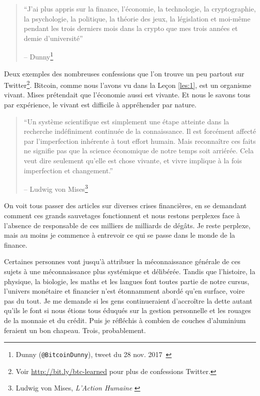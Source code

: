 \begin{quotation}\begin{samepage}
\enquote{J'ai plus appris sur la finance, l'économie, la technologie, la
cryptographie, la psychologie, la politique, la théorie des jeux, la législation
et moi-même pendant les trois derniers mois dans la crypto que mes trois années
et demie d'université}
\begin{flushright} -- Dunny\footnote{Dunny (\texttt{@BitcoinDunny}), tweet du 28
nov. 2017~\cite{bitcoindunny-tweet}}
\end{flushright}\end{samepage}\end{quotation}

Deux exemples des nombreuses confessions que l'on trouve un peu partout sur
Twitter\footnote{Voir \url{http://bit.ly/btc-learned} pour plus de confessions
Twitter.}. Bitcoin, comme nous l'avons vu dans la Leçon \ref{les:1}, est un
organisme vivant. Mises prétendait que l'économie aussi est vivante. Et nous le
savons tous par expérience, le vivant est difficile à appréhender par nature.

\begin{quotation}\begin{samepage}
\enquote{Un système scientifique est simplement une étape atteinte dans la
recherche indéfiniment continuée de la connaissance. Il est forcément affecté
par l'imperfection inhérente à tout effort humain. Mais reconnaître ces faits ne
signifie pas que la science économique de notre temps soit arriérée. Cela veut
dire seulement qu'elle est chose vivante, et vivre implique à la fois
imperfection et changement.}
\begin{flushright} -- Ludwig von Mises\footnote{Ludwig von Mises, \textit{L'Action Humaine}
\cite{human-action}}
\end{flushright}\end{samepage}\end{quotation}

\newpage

On voit tous passer des articles sur diverses crises financières, en se
demandant comment ces grands sauvetages fonctionnent et nous restons perplexes
face à l'absence de responsable de ces milliers de milliards de dégâts. Je reste
perplexe, mais au moins je commence à entrevoir ce qui se passe dans le monde de
la finance.

Certaines personnes vont jusqu'à attribuer la méconnaissance générale de ces
sujets à une méconnaissance plus systémique et délibérée. Tandis que l'histoire,
la physique, la biologie, les maths et les langues font toutes partie de notre
cursus, l'univers monétaire et financier n'est étonnamment abordé qu'en surface,
voire pas du tout. Je me demande si les gens continueraient d'accroître la dette
autant qu'ils le font si nous étions tous éduqués sur la gestion personnelle et
les rouages de la monnaie et du crédit. Puis je réfléchis à combien de couches
d'aluminium feraient un bon chapeau. Trois, probablement.

